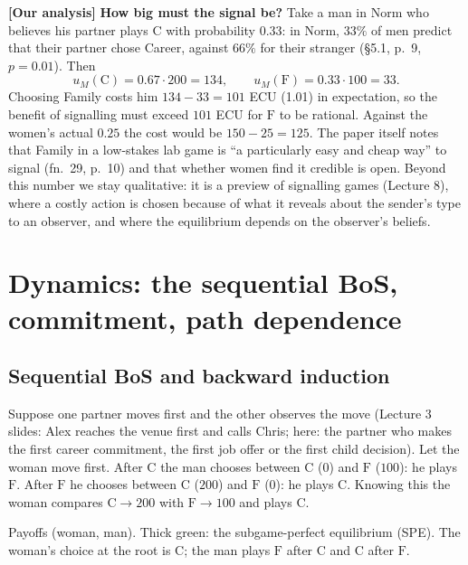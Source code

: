 \documentclass[11pt,a4paper]{article}
\newcommand{\ours}{\textcolor{warn}{\textbf{[Our analysis]}}}
\newcommand{\C}{\mathrm{C}}
\newcommand{\Fm}{\mathrm{F}}
\begin{document}
\ours{} \textbf{How big must the signal be?} Take a man in Norm who believes his partner plays $\C$
with probability $0.33$: in Norm, $33\%$ of men predict that their partner chose Career, against
$66\%$ for their stranger (\S5.1, p.~9, $p=0.01$). Then
\[
u_M(\C)=0.67\cdot200=134,\qquad u_M(\Fm)=0.33\cdot100=33 .
\]
Choosing Family costs him $134-33=101$ ECU (\texteuro{}1.01) in expectation, so
the benefit of signalling must exceed $101$ ECU for $\Fm$ to be rational. Against the women's actual
$0.25$ the cost would be $150-25=125$. The paper itself notes that Family in a low-stakes lab game
is ``a particularly easy and cheap way'' to signal (fn.~29, p.~10) and that whether women find it
credible is open. Beyond this number we stay qualitative: it is a preview of signalling games
(Lecture 8), where a costly action is chosen because of what it reveals about the sender's type
to an observer, and where the equilibrium depends on the observer's beliefs.

\section{Dynamics: the sequential BoS, commitment, path dependence}

\subsection{Sequential BoS and backward induction}
Suppose one partner moves first and the other observes the move (Lecture 3 slides: Alex reaches
the venue first and calls Chris; here: the partner who makes the first career commitment, the
first job offer or the first child decision). Let the woman move first.
After $\C$ the man chooses between $\C$ ($0$) and $\Fm$ ($100$): he plays $\Fm$. After $\Fm$ he chooses
between $\C$ ($200$) and $\Fm$ ($0$): he plays $\C$. Knowing this the woman compares $\C\to200$ with
$\Fm\to100$ and plays $\C$.

\begin{center}

{\footnotesize Payoffs (woman, man). Thick green: the subgame-perfect equilibrium (SPE). The woman's
choice at the root is $\C$; the man plays $\Fm$ after $\C$ and $\C$ after $\Fm$.}
\end{center}
\end{document}
